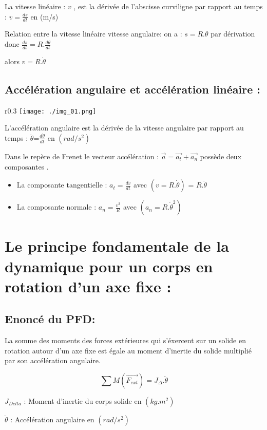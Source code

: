 \documentclass[12pt]{article}
\begin{document}
La vitesse linéaire : $v$ , est la dérivée de l'abscisse curviligne par rapport au temps : $v = \frac{ds}{dt}$ en (m/s)

Relation entre la vitesse linéaire vitesse angulaire: on a : $s = R.\theta$ par dérivation donc $\frac{ds}{dt} = R . \frac{d{\theta}}{dt}$

alors $v = R.\dot{\theta}$

\subsection{Accélération angulaire et accélération linéaire :}
\begin{wrapfigure}[5]{r}{0.3\textwidth}
	\vspace{-2cm}
	\texttt{[image: ./img\_01.png]}
\end{wrapfigure}
L'accélération angulaire est la dérivée de la vitesse angulaire par rapport au temps : $\ddot{\theta}$=$ \frac{d\dot{\theta}}{dt}$ en $(rad/s^2)$

Dans le repère de Frenet le vecteur accélération : $\vec{a} = \vec{a_t} + \vec{a_n}$ possède deux composantes . 

\begin{itemize}
	\item La composante tangentielle : $a_t = \frac{dv}{dt}$ avec $(v = R.\dot{\theta})$  = $R.\ddot{\theta}$

	\item La composante normale : $a_n = \frac{v^2}{R}$ avec $(a_n = R.\dot{\theta}^2)$
\end{itemize}

\section{Le principe fondamentale de la dynamique pour un corps en rotation d'un axe fixe : }

\subsection{Enoncé du PFD: }
La somme des moments des forces extérieures qui s'éxercent sur un solide en rotation autour d’un axe fixe est égale au
moment d’inertie du solide multiplié par son accélération angulaire.

$$\sum{M(\vec{F_{ext}})} = J_{\Delta}.\ddot{\theta}$$

$J_{Delta}$ : Moment d'inertie du corps solide en $(kg.m^2)$

$\ddot{\theta}$ : Accélération angulaire en $(rad/s^2)$
\end{document}
